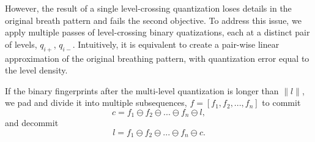 However, the result of a single level-crossing quantization loses details in the original breath pattern and fails the second objective. To address this issue, we apply multiple passes of level-crossing binary quatizations, each at a distinct pair of levels, $q_{i+}$, $q_{i-}$. Intuitively, it is equivalent to create a pair-wise linear approximation of the original breathing pattern, with quantization error equal to the level density.

If the binary fingerprints after the multi-level quantization is longer than $\|l\|$, we pad and divide it into multiple subsequences, $f = [ f_1, f_2,...,f_n]$ to commit
\[
c = f_1 \ominus f_2 \ominus ... \ominus f_n \ominus l,
\]
and decommit
\[
l = f_1 \ominus f_2 \ominus ... \ominus f_n \ominus c.
\]



